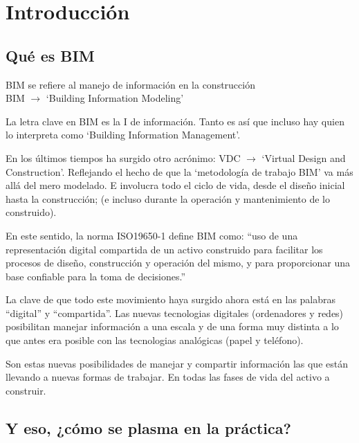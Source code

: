 \documentclass[spanish,12pt,a4paper,final,oneside]{book}
\begin{document}
\hypersetup{linkcolor=black}
\tableofcontents


\chapter{Introducción}

\section{Qué es BIM}

BIM se refiere al manejo de información en la construcción
\\BIM $\rightarrow$  `Building Information Modeling'

La letra clave en BIM es la I de información. Tanto es así que incluso hay quien lo interpreta como `Building Information Management'.

En los últimos tiempos ha surgido otro acrónimo: VDC $\rightarrow$ `Virtual Design and Construction'. Reflejando el hecho de que la `metodología de trabajo BIM' va más allá del mero modelado. E involucra todo el ciclo de vida, desde el diseño inicial hasta la construcción; (e incluso durante la operación y mantenimiento de lo construido). 

En este sentido, la norma ISO19650-1 define BIM como: “uso de una representación digital compartida de un activo construido para facilitar los procesos de diseño, construcción y operación del mismo, y para proporcionar una base confiable para la toma de decisiones.”

La clave de que todo este movimiento haya surgido ahora está en las palabras ``digital'' y ``compartida''. Las nuevas tecnologias digitales (ordenadores y redes) posibilitan manejar información a una escala y de una forma muy distinta a lo que antes era posible con las tecnologias analógicas (papel y teléfono).

Son estas nuevas posibilidades de manejar y compartir información las que están llevando a nuevas formas de trabajar. En todas las fases de vida del activo a construir.

\section{Y eso, ¿cómo se plasma en la práctica?}
\end{document}
